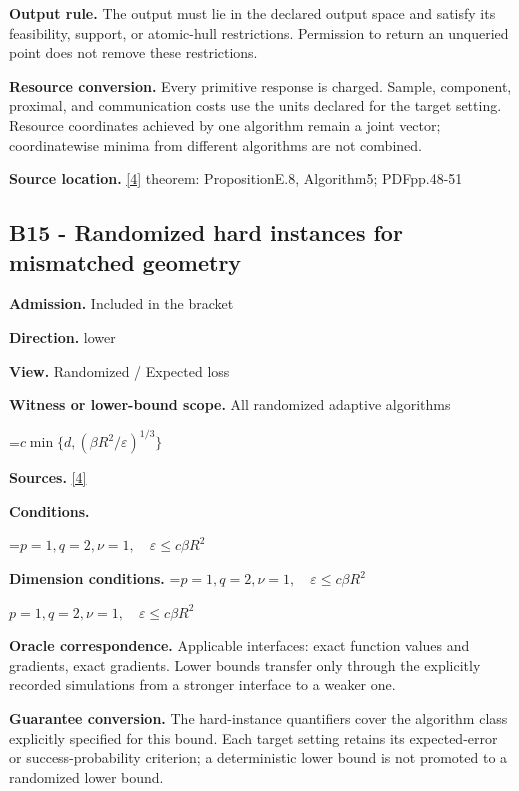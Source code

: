 \documentclass[10pt,a4paper]{article}
\newcommand{\AtlasMath}[1]{\par\begingroup\centering\setbox0=\hbox{$\displaystyle #1$}\ifdim\wd0>1.4\linewidth\typeout{ATLAS WIDE FORMULA: \the\wd0}\fi\ifdim\wd0>\linewidth\resizebox{\linewidth}{!}{\box0}\else\box0\fi\par\endgroup}
\newcommand{\AtlasInlineMath}[1]{\begingroup\setbox0=\hbox{$#1$}\ifdim\wd0>.4\linewidth\endgroup\AtlasMath{#1}\else\endgroup$#1$\fi}
\begin{document}
\textbf{Output rule.} The output must lie in the declared output space and satisfy its feasibility, support, or atomic-hull restrictions. Permission to return an unqueried point does not remove these restrictions.



\textbf{Resource conversion.} Every primitive response is charged. Sample, component, proximal, and communication costs use the units declared for the target setting. Resource coordinates achieved by one algorithm remain a joint vector; coordinatewise minima from different algorithms are not combined.



\textbf{Source location.} \href{https://arxiv.org/pdf/2609.32910}{[4]} theorem: PropositionE.8, Algorithm5; PDFpp.48-51



\subsection{B15 - Randomized hard instances for mismatched geometry}


\textbf{Admission.} Included in the bracket



\textbf{Direction.} lower



\textbf{View.} Randomized / Expected loss



\textbf{Witness or lower-bound scope.} All randomized adaptive algorithms



\AtlasMath{c\min\{d,(\beta R^2/\varepsilon)^{1/3}\}}


\textbf{Sources.} \href{https://arxiv.org/pdf/2609.32910}{[4]}



\textbf{Conditions.}
\AtlasMath{p=1,q=2,\nu=1,\quad\varepsilon\le c\beta R^2}




\textbf{Dimension conditions.} \AtlasInlineMath{p=1,q=2,\nu=1,\quad\varepsilon\le c\beta R^2}



\textbf{Oracle correspondence.} Applicable interfaces: exact function values and gradients, exact gradients. Lower bounds transfer only through the explicitly recorded simulations from a stronger interface to a weaker one.



\textbf{Guarantee conversion.} The hard-instance quantifiers cover the algorithm class explicitly specified for this bound. Each target setting retains its expected-error or success-probability criterion; a deterministic lower bound is not promoted to a randomized lower bound.
\end{document}
